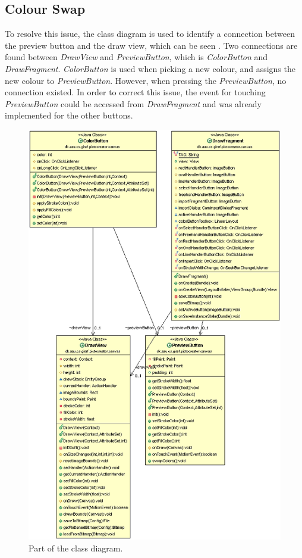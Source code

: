 \subsection{Colour Swap}\label{sec:colorSwap}
To resolve this issue, the class diagram is used to identify a connection between the preview button and the draw view, which can be seen .
Two connections are found between \textit{DrawView} and \textit{PreviewButton}, which is \textit{ColorButton} and \textit{DrawFragment}.
\textit{ColorButton} is used when picking a new colour, and assigns the new colour to \textit{PreviewButton}.
However, when pressing the \textit{PreviewButton}, no connection existed.
In order to correct this issue, the event for touching \textit{PreviewButton} could be accessed from \textit{DrawFragment} and was already implemented for the other buttons. 

\begin{figure}[h]
	\centering
	\includegraphics[scale = 1]{media/classdiagram-swapcolour-issue}
	\caption{Part of the class diagram.}
	\label{figure:class-diagram-colour-swap}
\end{figure}

